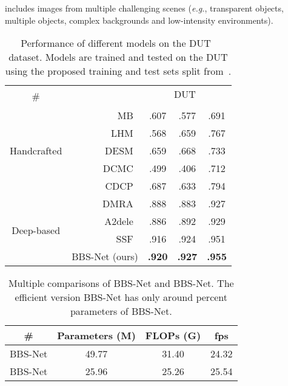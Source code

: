 \documentclass[journal]{IEEEtran}
\def\eg{\emph{e.g.}}
\begin{document}
includes  images from multiple challenging scenes (\eg, transparent objects, multiple objects, complex backgrounds and low-intensity environments). \begin{table}[t!]
	\caption{ Performance of different models on the DUT~\cite{piao2019DMRA} dataset. Models are trained and tested on the DUT using the proposed training and test sets split from~\cite{piao2019DMRA}.}
	\vspace{-5pt}
	\label{tab:dut_result}
	\centering
\setlength\aboverulesep{0.5pt}\setlength\belowrulesep{1pt}
\renewcommand{\arraystretch}{0.5}
	\setlength{\tabcolsep}{2.0mm}
	\footnotesize
	\begin{tabular}{c|r|ccc}
		\toprule
		\multicolumn{1}{c|}{\multirow{2}{*}{\#}}&\multicolumn{1}{c|}{\multirow{2}{*}{\diagbox{Method}{Dataset}}} & \multicolumn{3}{c}{DUT~\cite{piao2019DMRA}}\\\cline{3-5}
		&&&   &    \\\hline
		\multirow{5}{*}{Handcrafted}&
		MB~\cite{ZhuLGWW17MB}&.607&.577&.691\\
		&LHM~\cite{peng2014LHM}&.568&.659&.767\\
		&DESM~\cite{cheng2014DESM}&.659&.668&.733\\
		&DCMC~\cite{cong2016DCMC}&.499&.406&.712\\
		&CDCP~\cite{zhu2017CDCP}&.687&.633&.794\\\hline
		\multirow{4}{*}{Deep-based}&
DMRA~\cite{piao2019DMRA}&.888&.883&.927\\
		&A2dele~\cite{piao2020a2dele}&.886&.892&.929\\
		&SSF~\cite{zhang2020select}&.916&.924&.951\\
		&BBS-Net (ours)&\textbf{.920}&\textbf{.927}&\textbf{.955}\\
		\bottomrule
	\end{tabular}
\end{table}

\begin{table}[t!]
\footnotesize
	\caption{\small Multiple comparisons of BBS-Net and BBS-Net. The efficient version BBS-Net has only around  percent parameters of BBS-Net.}
\renewcommand\arraystretch{0.5}
	\setlength{\tabcolsep}{5.0mm}
	\begin{center}		
		\begin{tabular}{c|c|c|c}\toprule
			\#&Parameters (M)&FLOPs (G)&fps \\\hline
			BBS-Net&49.77&31.40&24.32\\
			BBS-Net&25.96&25.26&25.54\\
			\bottomrule
		\end{tabular}
	\end{center}
\label{tab:speed}
\end{table}
\end{document}
